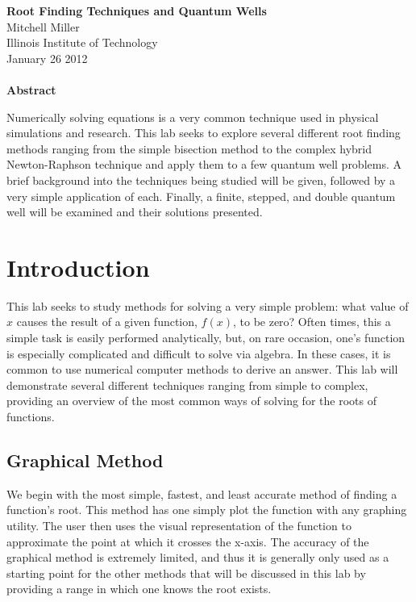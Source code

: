 \documentclass[12pt]{article}
\begin{document}
\begin{center}
\textbf{Root Finding Techniques and Quantum Wells} \\ 
Mitchell Miller \\
Illinois Institute of Technology \\
January 26 2012 {\ \\ \ \\}
\textbf{Abstract}\\
\end{center}
\noindent
Numerically solving equations is a very common technique used in physical simulations and research.  This lab seeks to explore several different root finding methods ranging from the simple bisection method to the complex hybrid Newton-Raphson technique and apply them to a few quantum well problems.  A brief background into the techniques being studied will be given, followed by a very simple application of each.  Finally, a finite, stepped, and double quantum well will be examined and their solutions presented.
\pagebreak
\section{Introduction}
This lab seeks to study methods for solving a very simple problem:  what value of $x$ causes the result of a given function,  $f(x)$, to be zero?  Often times, this a simple task is easily performed analytically, but, on rare occasion, one's function is especially complicated and difficult to solve via algebra.  In these cases, it is common to use numerical computer methods to derive an answer.  This lab will demonstrate several different techniques ranging from simple to complex, providing an overview of the most common ways of solving for the roots of functions.  
\subsection{Graphical Method}
We begin with the most simple, fastest, and least accurate method of finding a function's root.  This method has one simply plot the function with any graphing utility.  The user then uses the visual representation of the function to approximate the point at which it crosses the x-axis.  The accuracy of the graphical method is extremely limited, and thus it is generally only used as a starting point for the other methods that will be discussed in this lab by providing a range in which one knows the root exists.  
\end{document}
